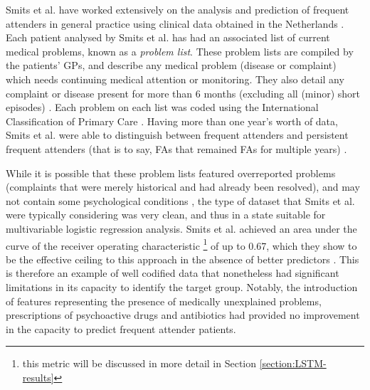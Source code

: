 Smits et al. have worked extensively on the analysis and prediction of frequent attenders in general practice using clinical data obtained in the Netherlands \cite{smits2009predictability}. Each patient analysed by Smits et al. has had an associated list of current medical problems, known as a \textit{problem list}. These problem lists are compiled by the patients' GPs, and describe any medical problem (disease or complaint) which needs continuing medical attention or monitoring. They also detail  any complaint or disease present for more than 6 months (excluding all (minor) short episodes) \cite{smits2009predictability}. Each problem on each list was coded using the International Classification of Primary Care  \cite{bentsen1986international,verbeke2006international}. Having more than one year's worth of data, Smits et al. were able to distinguish between frequent attenders and persistent frequent attenders (that is to say, FAs that remained FAs for multiple years) \cite{smits2013predictability}. 


While it is possible that these problem lists featured overreported problems (complaints that were merely historical and had already been resolved), and may not contain some psychological conditions \cite{smits2013predictability}, the type of dataset  that Smits et al. were typically considering was very clean, and thus in a state suitable for multivariable logistic regression analysis. Smits et al. achieved an area under the curve of the receiver operating characteristic \footnote{this metric will be discussed in more detail in Section \ref{section:LSTM-results}} of up to 0.67, which they show to be the effective ceiling to this approach in the absence of better predictors \cite{smits2013predictability}. This is therefore an example of well codified data that nonetheless had significant limitations in its capacity to identify the target group. Notably, the introduction of features representing the presence of medically unexplained problems, prescriptions of psychoactive drugs and antibiotics had provided no improvement in the capacity to predict frequent attender patients.   




